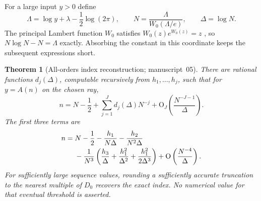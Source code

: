 \documentclass[11pt]{article}
\numberwithin{equation}{section}
\newtheorem{theorem}{Theorem}[section]
\theoremstyle{definition}
\theoremstyle{remark}
\theoremstyle{definition}
\newcommand{\bigO}{\mathrm O}
\begin{document}
For a large input $y>0$ define
\begin{equation}
 \Lambda=\log y+\lambda-\frac12\log(2\pi),\qquad
 N=\frac{\Lambda}{W_0(\Lambda/e)},\qquad
 \Delta=\log N.
 \label{spf:mg:eq:inverse-coordinates}
\end{equation}
The principal Lambert function $W_0$ satisfies $W_0(z)e^{W_0(z)}=z$
\cite{dlmfW}, so $N\log N-N=\Lambda$ exactly. Absorbing the constant
in this coordinate keeps the subsequent expressions short.

\begin{theorem}[All-orders index reconstruction; manuscript~05]
\label{spf:mg:thm:inverse}
There are rational functions $d_j(\Delta)$, computable recursively from
$h_1,\ldots,h_j$, such that for $y=A(n)$ on the chosen ray,
\begin{equation}
 n=N-\frac12+\sum_{j=1}^{J}d_j(\Delta)N^{-j}
             +\bigO_J\left(\frac{N^{-J-1}}{\Delta}\right).
 \label{spf:mg:eq:inverse-all}
\end{equation}
The first three terms are
\begin{align}
 n={}&N-\frac12-\frac{h_1}{N\Delta}-\frac{h_2}{N^2\Delta}\notag\\
    &-\frac1{N^3}\left(
           \frac{h_3}{\Delta}+\frac{h_1^2}{\Delta^2}
                       +\frac{h_1^2}{2\Delta^3}\right)
       +\bigO\left(\frac{N^{-4}}{\Delta}\right).
 \label{spf:mg:eq:inverse-three}
\end{align}
For sufficiently large sequence values, rounding a sufficiently accurate
truncation to the nearest multiple of $D_0$ recovers the exact index.
No numerical value for that eventual threshold is asserted.
\end{theorem}
\end{document}
